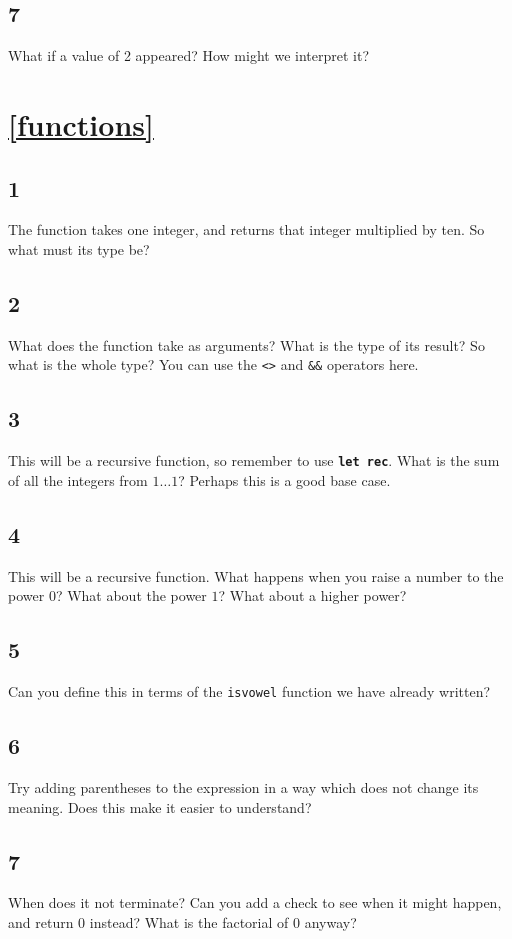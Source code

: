\documentclass[]{book}
\begin{document}
\subsection*{7}
What if a value of 2 appeared? How might we interpret it?

\section*{\ref{functions}\\ }
\subsection*{1}
The function takes one integer, and returns that integer multiplied by ten. So what must its type be?
\subsection*{2}
What does the function take as arguments? What is the type of its result? So what is the whole type? You can use the \texttt{<>} and \texttt{\&\&} operators here.
\subsection*{3}
This will be a recursive function, so remember to use \texttt{\textbf{let rec}}. What is the sum of all the integers from $1\ldots 1$? Perhaps this is a good base case. 
\subsection*{4}
This will be a recursive function. What happens when you raise a number to the power $0$? What about the power $1$? What about a higher power?
\subsection*{5}
Can you define this in terms of the \texttt{isvowel} function we have already written?
\subsection*{6}
Try adding parentheses to the expression in a way which does not change its meaning. Does this make it easier to understand?
\subsection*{7}
When does it not terminate? Can you add a check to see when it might happen, and return $0$ instead? What is the factorial of $0$ anyway?
\end{document}
